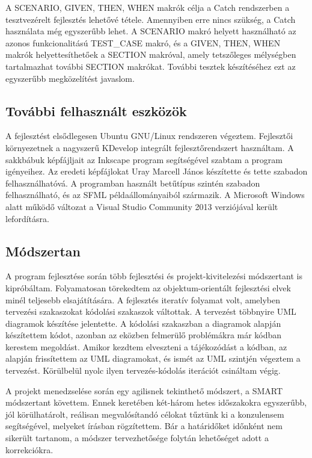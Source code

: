 \documentclass[12pt, twoside]{report}
\begin{document}
A SCENARIO, GIVEN, THEN, WHEN makrók célja a Catch rendszerben a tesztvezérelt fejlesztés lehetővé tétele. Amennyiben erre nincs szükség, a Catch használata még egyszerűbb lehet. A SCENARIO makró helyett használható az azonos funkcionalitású TEST\_CASE makró, és a GIVEN, THEN, WHEN makrók helyettesíthetőek a SECTION makróval, amely tetszőleges mélységben tartalmazhat további SECTION makrókat. További tesztek készítéséhez ezt az egyszerűbb megközelítést javaslom.

\subsection{További felhasznált eszközök}

A fejlesztést elsődlegesen Ubuntu GNU/Linux rendszeren végeztem. Fejlesztői környezetnek a nagyszerű KDevelop integrált fejlesztőrendszert használtam. A sakkbábuk képfájljait az Inkscape program segítségével szabtam a program igényeihez. Az eredeti képfájlokat Uray Marcell János készítette és tette szabadon felhasználhatóvá. A programban használt betűtípus szintén szabadon felhasználható, és az SFML példaállományaiból származik. A Microsoft Windows alatt működő változat a Visual Studio Community 2013 verziójával került lefordításra.

\subsection{Módszertan}

A program fejlesztése során több fejlesztési és projekt-kivitelezési módszertant is kipróbáltam. Folyamatosan törekedtem az objektum-orientált fejlesztési elvek minél teljesebb elsajátítására. A fejlesztés iteratív folyamat volt, amelyben tervezési szakaszokat kódolási szakaszok váltottak. A tervezést többnyire UML diagramok készítése jelentette. A kódolási szakaszban a diagramok alapján készítettem kódot, azonban az eközben felmerülő problémákra már kódban kerestem megoldást. Amikor kezdtem elveszteni a tájékozódást a kódban, az alapján frissítettem az UML diagramokat, és ismét az UML szintjén végeztem a tervezést. Körülbelül nyolc ilyen tervezés-kódolás iterációt csináltam végig.

A projekt menedzselése során egy agilisnek tekinthető módszert, a SMART módszertant követtem. Ennek keretében két-három hetes időszakokra egyszerűbb, jól körülhatárolt, reálisan megvalósítandó célokat tűztünk ki a konzulensem segítségével, melyeket írásban rögzítettem. Bár a határidőket időnként nem sikerült tartanom, a módszer tervezhetősége folytán lehetőséget adott a korrekciókra.
\end{document}
